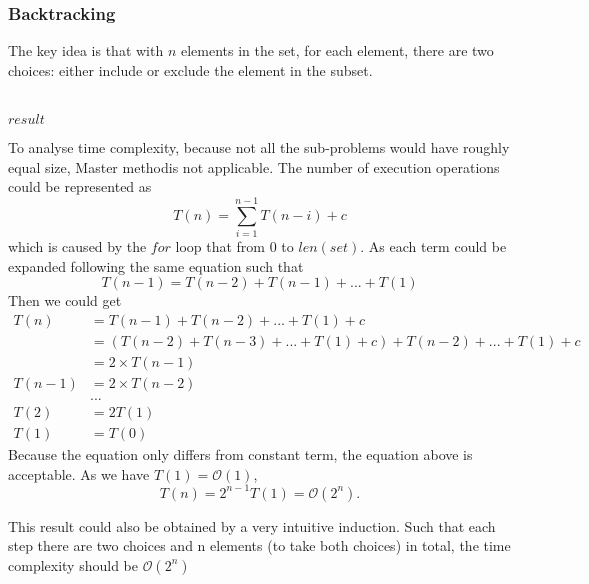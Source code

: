 \documentclass[catalog.tex]{subfiles}
\begin{document}
\subsubsection{Backtracking}
The key idea is that with $n$ elements in the set, for each element, there are two choices: either include or exclude the element in the subset.
\begin{Algorithm}
	\BlankLine
	\BlankLine
{}
 \\
\Ret $result$
\end{Algorithm}

To analyse time complexity, because not all the sub-problems would have roughly equal size, Master methodis not applicable. The number of execution operations could be represented as 
$$T(n) = \sum_{i=1}^{n-1} T(n-i) + c$$
which is caused by the $for$ loop that from $0$ to $len(set)$. As each term could be expanded following the same equation such that $$T(n-1) = T(n-2) + T(n-1)+...+T(1)$$
Then we could get 
\begin{align*}
T(n) &= T(n-1) + T(n-2) + ... + T(1) + c \\
&=\left( T(n-2) + T(n-3)+ ... + T(1) + c \right) + T(n-2) + ... + T(1) + c \\
&= 2\times T(n-1) \\
T(n-1) &= 2\times T(n-2) \\
&... \\
T(2) &= 2T(1) \\
T(1) &=T(0)
\end{align*}
Because the equation only differs from constant term, the equation above is acceptable. As we have $T(1) = \mathcal{O}(1)$, $$T(n) = 2^{n-1}T(1) = \mathcal{O}(2^n).$$

This result could also be obtained by a very intuitive induction. Such that each step there are two choices and  n elements (to take both choices) in total, the time complexity should be  $\mathcal{O}(2^n)$
\end{document}
